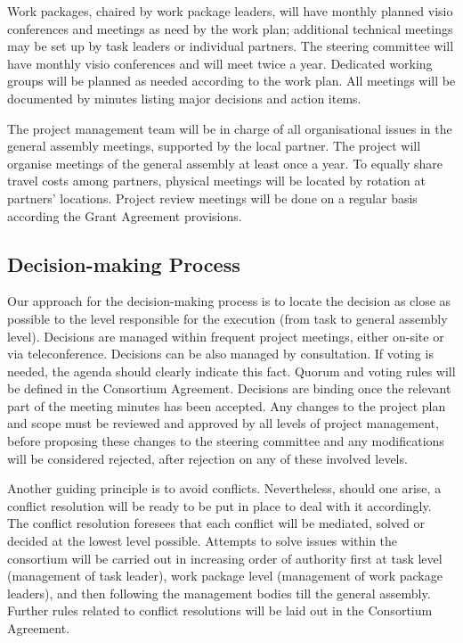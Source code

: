 Work packages, chaired by work package leaders, will have monthly
planned visio conferences and meetings as need by the work plan;
additional technical meetings may be set up by task leaders or
individual partners. The steering committee will have monthly visio
conferences and will meet twice a year. Dedicated working groups will
be planned as needed according to the work plan.  All meetings will be
documented by minutes listing major decisions and action items.

The project management team will be in charge of all organisational
issues in the general assembly meetings, supported by the local
partner. The project will organise meetings of the general assembly at
least once a year. To equally share travel costs among partners,
physical meetings will be located by rotation at partners’
locations. Project review meetings will be done on a regular basis
according the Grant Agreement provisions.

\subsection*{Decision-making Process}

Our approach for the decision-making process is to locate the decision
as close as possible to the level responsible for the execution (from
task to general assembly level). Decisions are managed within
frequent project meetings, either on-site or via
teleconference. Decisions can be also managed by consultation. If
voting is needed, the agenda should clearly indicate this fact. Quorum
and voting rules will be defined in the Consortium
Agreement. Decisions are binding once the relevant part of the meeting
minutes has been accepted. Any changes to the project plan and scope
must be reviewed and approved by all levels of project management,
before proposing these changes to the steering committee and any
modifications will be considered rejected, after rejection on any of
these involved levels.

Another guiding principle is to avoid conflicts. Nevertheless, should
one arise, a conflict resolution will be ready to be put in place to
deal with it accordingly. The conflict resolution foresees that each
conflict will be mediated, solved or decided at the lowest level
possible. Attempts to solve issues within the consortium will be
carried out in increasing order of authority first at task level
(management of task leader), work package level (management of work
package leaders), and then following the management bodies till the
general assembly. Further rules related to conflict resolutions will
be laid out in the Consortium Agreement.


